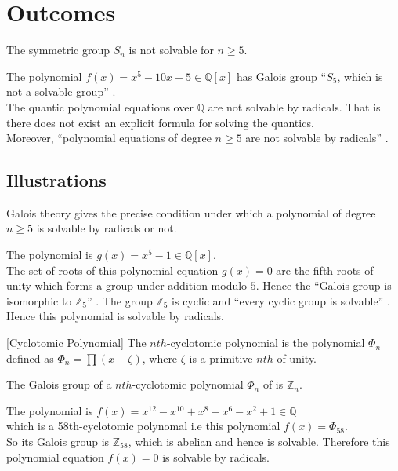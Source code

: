 \section{Outcomes}
\begin{theorem} \cite{hunger}
The symmetric group \(S_n\) is not solvable for \(n \geq 5\).
\end{theorem}

The polynomial \(f(x)=x^5-10x+5 \in \mathbb{Q}[x]\) has Galois group ``\(S_5\), which is not a solvable group'' \cite{hunger}. \\[3mm]
The quantic polynomial equations over \(\mathbb{Q}\) are not solvable by radicals. That is there does not exist an explicit formula for solving the quantics. \\
Moreover, ``polynomial equations of degree \(n \geq 5\) are not solvable by radicals'' \cite{hunger}.

\subsection{Illustrations}
Galois theory gives the precise condition under which a polynomial of degree \(n \geq 5\) is solvable by radicals or not.

\vspace{5mm}
\begin{example}
  The polynomial is \(g(x)=x^5-1 \in \mathbb{Q}[x]\).\\
  The set of  roots of this polynomial equation \(g(x)=0\) are the fifth roots of unity which forms a group under addition modulo \(5\). Hence the ``Galois group is isomorphic to \(\mathbb{Z}_5\)'' \cite{hunger}. The group \(\mathbb{Z}_5\) is cyclic and ``every cyclic group is solvable'' \cite{galois}. Hence this polynomial is solvable by radicals.
\end{example}

\vspace{3mm}
\begin{definition} \cite{galois} [Cyclotomic Polynomial]
  The \(nth\)-cyclotomic polynomial is the polynomial \({\Phi}_n\) defined as \({\Phi}_n= \prod {(x-\zeta)}\), where \(\zeta\) is a primitive-\(nth\) of unity.
\end{definition}

\vspace{3mm}
\begin{theorem} \cite{galois}
  The Galois group of a \(nth\)-cyclotomic polynomial \({\Phi}_n\) of is \(\mathbb{Z}_n\).
\end{theorem}

\vspace{3mm}
\begin{example}
The polynomial is \(f(x)=x^{12}-x^{10}+x^8-x^6-x^2+1 \in \mathbb{Q}\)\\
which is a 58th-cyclotomic polynomal i.e this polynomial \(f(x)={\Phi}_{58}\).\\
  So its Galois group is \(\mathbb{Z}_{58}\), which is abelian and hence is solvable. Therefore this polynomial equation \(f(x)=0\) is solvable by radicals.
\end{example}
